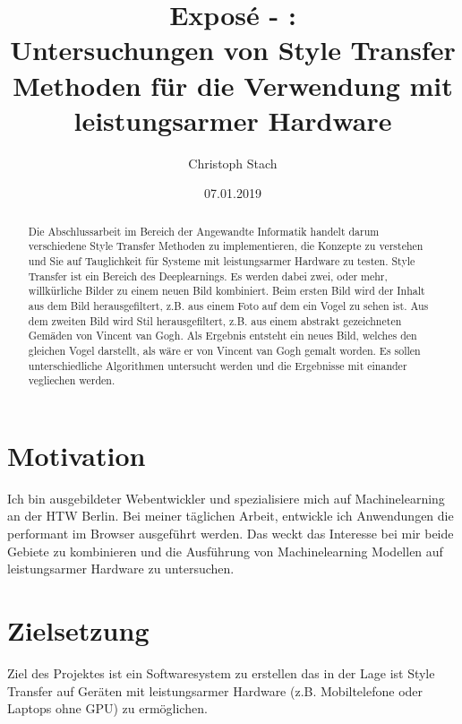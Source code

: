 


\title{\bf Exposé - \@exposeType:\protect\\ Untersuchungen von Style Transfer Methoden für die Verwendung mit leistungsarmer Hardware}
\author{Christoph Stach}
\date{07.01.2019}



\maketitle

\begin{otherlanguage}{ngerman}
	\begin{abstract}
		Die Abschlussarbeit im Bereich der Angewandte Informatik handelt darum verschiedene Style Transfer Methoden zu implementieren,
		die Konzepte zu verstehen und Sie auf Tauglichkeit für Systeme mit leistungsarmer Hardware zu testen. Style Transfer ist ein Bereich des 
		Deeplearnings. Es werden dabei zwei, oder mehr, willkürliche Bilder zu einem neuen Bild kombiniert. Beim ersten Bild wird der Inhalt aus dem Bild herausgefiltert,
		z.B. aus einem Foto auf dem ein Vogel zu sehen ist. Aus dem zweiten Bild wird Stil herausgefiltert, z.B. aus einem abstrakt gezeichneten Gemäden von Vincent van Gogh.
		Als Ergebnis entsteht ein neues Bild, welches den gleichen Vogel darstellt, als wäre er von Vincent van Gogh gemalt worden. 
		Es sollen unterschiedliche Algorithmen untersucht werden und die Ergebnisse mit einander vegliechen werden.
	\end{abstract}
\end{otherlanguage}

\pagebreak

\section{Motivation}
Ich bin ausgebildeter Webentwickler und spezialisiere mich auf Machinelearning an der HTW Berlin. Bei meiner täglichen Arbeit,
entwickle ich Anwendungen die performant im Browser ausgeführt werden. Das weckt das Interesse bei mir beide Gebiete zu kombinieren
und die Ausführung von Machinelearning Modellen auf leistungsarmer Hardware zu untersuchen.

\section{Zielsetzung}
Ziel des Projektes ist ein Softwaresystem zu erstellen das in der Lage ist
Style Transfer auf Geräten mit leistungsarmer Hardware (z.B. Mobiltelefone oder Laptops ohne GPU) zu ermöglichen.


